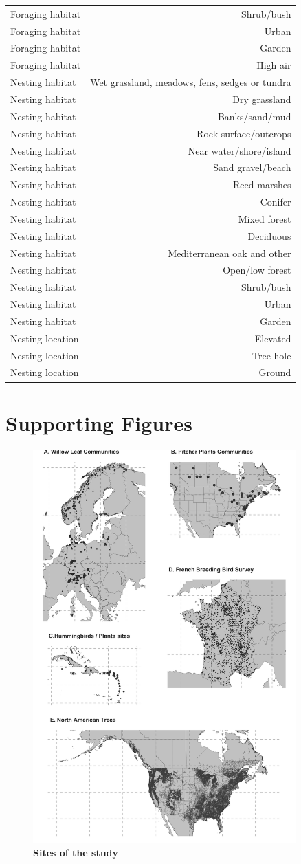 \begin{longtable}[]{@{}lr@{}}
Foraging habitat & Shrub/bush\tabularnewline
Foraging habitat & Urban\tabularnewline
Foraging habitat & Garden\tabularnewline
Foraging habitat & High air\tabularnewline
Nesting habitat & Wet grassland, meadows, fens, sedges or
tundra\tabularnewline
Nesting habitat & Dry grassland\tabularnewline
Nesting habitat & Banks/sand/mud\tabularnewline
Nesting habitat & Rock surface/outcrops\tabularnewline
Nesting habitat & Near water/shore/island\tabularnewline
Nesting habitat & Sand gravel/beach\tabularnewline
Nesting habitat & Reed marshes\tabularnewline
Nesting habitat & Conifer\tabularnewline
Nesting habitat & Mixed forest\tabularnewline
Nesting habitat & Deciduous\tabularnewline
Nesting habitat & Mediterranean oak and other\tabularnewline
Nesting habitat & Open/low forest\tabularnewline
Nesting habitat & Shrub/bush\tabularnewline
Nesting habitat & Urban\tabularnewline
Nesting habitat & Garden\tabularnewline
Nesting location & Elevated\tabularnewline
Nesting location & Tree hole\tabularnewline
Nesting location & Ground\tabularnewline
\bottomrule
\end{longtable}

\newpage

\section{Supporting Figures}\label{supporting-figures}

\begin{figure}
\centering
\includegraphics[width=0.90000\textwidth]{chapitre3/figS1.png}
\caption{\textbf{Sites of the study}\label{fig:maps}}
\end{figure}

